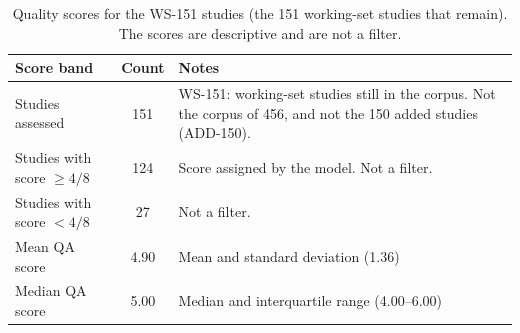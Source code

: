 \begin{table}[htbp]
\centering
\caption{Quality scores for the WS-151 studies (the 151 working-set studies that remain). The scores are descriptive and are not a filter.}
\label{tab:qa-results}
\begin{tabular}{lcp{6.5cm}}
\toprule
\textbf{Score band} & \textbf{Count} & \textbf{Notes} \\
\midrule
Studies assessed & 151 & WS-151: working-set studies still in the corpus. Not the corpus of 456, and not the 150 added studies (ADD-150). \\
Studies with score $\geq 4/8$ & 124 & Score assigned by the model. Not a filter. \\
Studies with score $< 4/8$ & 27 & Not a filter. \\
Mean QA score & 4.90 & Mean and standard deviation (1.36) \\
Median QA score & 5.00 & Median and interquartile range (4.00--6.00) \\
\bottomrule
\end{tabular}
\end{table}
